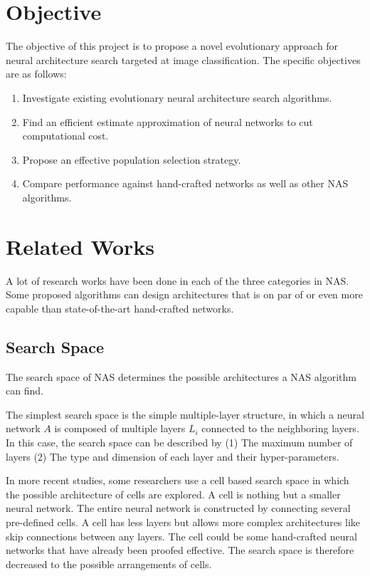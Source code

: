 \documentclass{article}
\begin{document}
\begin{normalsize}
   
    \section{Objective}

    The objective of this project is to propose a novel evolutionary approach for neural architecture search targeted at image classification. The specific objectives are as follows:
    \begin{enumerate}
      \item Investigate existing evolutionary neural architecture search algorithms.
      \item Find an efficient estimate approximation of neural networks to cut computational cost.
      \item Propose an effective population selection strategy.
      \item Compare performance against hand-crafted networks as well as other NAS algorithms.
    \end{enumerate}

    \section{Related Works}
    A lot of research works have been done in each of the three categories in NAS. Some proposed algorithms can design architectures that is on par of or even more capable than state-of-the-art hand-crafted networks.
    
    \subsection{Search Space}
    
    The search space of NAS determines the possible architectures a NAS algorithm can find.

    The simplest search space is the simple multiple-layer structure, in which a neural network $A$ is composed of multiple layers $L_i$ connected to the neighboring layers. In this case, the search space can be described by (1) The maximum number of layers (2) The type and dimension of each layer and their hyper-parameters\cite{chollet2017xception}\cite{baker2016designing}. 

    In more recent studies, some researchers use a cell based search space in which the possible architecture of cells are explored. A cell is nothing but a smaller neural network. The entire neural network is constructed by connecting several pre-defined cells. A cell has less layers but allows more complex architectures like skip connections between any layers\cite{cai2018path}\cite{real2018regularized}. The cell could be some hand-crafted neural networks that have already been proofed effective. The search space is therefore decreased to the possible arrangements of cells.


\end{normalsize}
\end{document}

